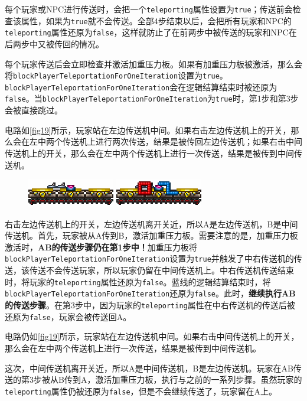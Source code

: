 每个玩家或NPC进行传送时，会把一个\lstinline{teleporting}属性设置为\lstinline{true}；传送前会检查该属性，如果为\lstinline{true}就不会传送。全部4步结束以后，会把所有玩家和NPC的\lstinline{teleporting}属性还原为\lstinline{false}，这样就防止了在前两步中被传送的玩家和NPC在后两步中又被传回的情况。

每个玩家传送后会立即检查并激活加重压力板。如果有加重压力板被激活，那么会将\lstinline{blockPlayerTeleportationForOneIteration}设置为\lstinline{true}。\lstinline{blockPlayerTeleportationForOneIteration}会在逻辑结算结束时被还原为\lstinline{false}。当\lstinline{blockPlayerTeleportationForOneIteration}为\lstinline{true}时，第1步和第3步会被直接跳过。

\begin{example}
电路如\autoref{fig19}所示，玩家站在左边传送机中间。如果右击左边传送机上的开关，那么会在左中两个传送机上进行两次传送，结果是被传回左边传送机；如果右击中间传送机上的开关，那么会在左中两个传送机上进行一次传送，结果是被传到中间传送机。

\begin{figure}[!ht]
\centering
\includegraphics{images/379.png}
\qquad
\includegraphics{images/380.png}
\caption{}\label{fig19}
\end{figure}

右击左边传送机上的开关，左边传送机离开关近，所以A是左边传送机，B是中间传送机。首先，玩家被从A传到B，激活加重压力板。需要注意的是，加重压力板激活时，\textbf{AB的传送步骤仍在第1步中！}加重压力板将\lstinline{blockPlayerTeleportationForOneIteration}设置为\lstinline{true}并触发了中右传送机的传送，该传送不会传送玩家，所以玩家仍留在中间传送机上。中右传送机传送结束时，将玩家的\lstinline{teleporting}属性还原为\lstinline{false}。蓝线的逻辑结算结束时，将\lstinline{blockPlayerTeleportationForOneIteration}还原为\lstinline{false}。此时，\textbf{继续执行AB的传送步骤}。在第3步中，因为玩家的\lstinline{teleporting}属性在中右传送机的传送后被还原为\lstinline{false}，玩家会被传送回A。
\end{example}

\begin{example}
电路仍如\autoref{fig19}所示，玩家站在左边传送机中间。如果右击中间传送机上的开关，那么会在左中两个传送机上进行一次传送，结果是被传到中间传送机。

这次，中间传送机离开关近，所以A是中间传送机，B是左边传送机。玩家在AB传送的第3步被从B传到A，激活加重压力板，执行与之前的一系列步骤。虽然玩家的\lstinline{teleporting}属性仍被还原为\lstinline{false}，但是不会继续传送了，玩家留在A上。
\end{example}

